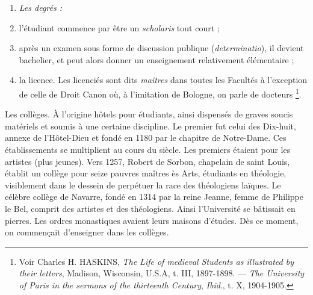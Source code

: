 \documentclass[french,twoside]{book} %
\newlength{\listmod}
\newcommand{\listhead}[1]{\hspace{-1\listmod}\emph{#1}}
\def\bignobreak{\ifdim\lastskip<\bigskipamount
  \removelastskip\nopagebreak\bigskip\fi}
\newcommand{\labelblock}[1]{\bigskip{\color{rubric}\bfseries\centering #1\par}\bignobreak}
\begin{document}
\begin{enumerate}[itemsep=0pt,]
\item[]\listhead{Les degrés :}
\item l’étudiant commence par être un {\itshape scholaris} tout court ;
\item après un examen sous forme de discussion publique ({\itshape determinatio}), il devient bachelier, et peut alors donner un enseignement relativement élémentaire ;
\item la licence. Les licenciés sont dits \emph{maîtres} dans toutes les Facultés à l’exception de celle de Droit Canon où, à l’imitation de Bologne, on parle de docteurs \footnote{ Voir Charles H. HASKINS, {\itshape The Life of medieval Students as illustrated by their letters}, Madison, Wisconsin, U.S.A, t. III, 1897-1898. — {\itshape The University of Paris in the sermons of the thirteenth Century}, {\itshape Ibid}., t. X, 1904-1905.}.

\end{enumerate}\noindent Les collèges. À l’origine hôtels pour étudiants, ainsi dispensés de graves soucis matériels et soumis à une certaine discipline. Le premier fut celui des Dix-huit, annexe de l’Hôtel-Dieu et fondé en 1180 par le chapitre de Notre-Dame. Ces établissements se multiplient au cours du siècle. Les premiers étaient pour les artistes (plus jeunes). Vers 1257, Robert de Sorbon, chapelain de saint Louis, établit un collège pour seize pauvres maîtres ès Arts, étudiants en théologie, visiblement dans le dessein de perpétuer la race des théologiens laïques. Le célèbre collège de Navarre, fondé en 1314 par la reine Jeanne, femme de Philippe le Bel, comprit des artistes et des théologiens. Ainsi l’Université se bâtissait en pierres. Les ordres monastiques avaient leurs maisons d’études. Dès ce moment, on commençait d’enseigner dans les collèges.\par

\labelblock{Les ordres mendiants.}
\end{document}
